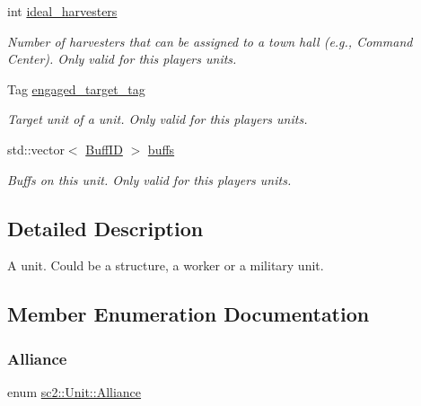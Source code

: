 \begin{DoxyCompactItemize}
\mbox{\label{classsc2_1_1_unit_a59c9e7c9c14f50f11d33b58716f664fe}} 
int \hyperlink{classsc2_1_1_unit_a59c9e7c9c14f50f11d33b58716f664fe}{ideal\+\_\+harvesters}
\begin{DoxyCompactList}\small\item\em Number of harvesters that can be assigned to a town hall (e.\+g., Command Center). Only valid for this player\textquotesingle{}s units. \end{DoxyCompactList}\item 
\mbox{\label{classsc2_1_1_unit_a0d1cc770a037ed2458bf944a787dcca5}} 
Tag \hyperlink{classsc2_1_1_unit_a0d1cc770a037ed2458bf944a787dcca5}{engaged\+\_\+target\+\_\+tag}
\begin{DoxyCompactList}\small\item\em Target unit of a unit. Only valid for this player\textquotesingle{}s units. \end{DoxyCompactList}\item 
\mbox{\label{classsc2_1_1_unit_a34f17705c61114ad78c192ed7b06a9af}} 
std\+::vector$<$ \hyperlink{classsc2_1_1_s_c2_type}{Buff\+ID} $>$ \hyperlink{classsc2_1_1_unit_a34f17705c61114ad78c192ed7b06a9af}{buffs}
\begin{DoxyCompactList}\small\item\em Buffs on this unit. Only valid for this player\textquotesingle{}s units. \end{DoxyCompactList}\end{DoxyCompactItemize}


\subsection{Detailed Description}
A unit. Could be a structure, a worker or a military unit. 

\subsection{Member Enumeration Documentation}
\mbox{\label{classsc2_1_1_unit_a5a40e672e7599d73ef8ef5758bbd7461}} 
\subsubsection{\texorpdfstring{Alliance}{Alliance}}
{\footnotesize\ttfamily enum \hyperlink{classsc2_1_1_unit_a5a40e672e7599d73ef8ef5758bbd7461}{sc2\+::\+Unit\+::\+Alliance}}



